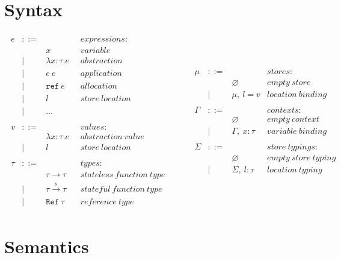 \documentclass{llncs}
\newcommand{\reftt}{\mathtt{ref}~}
\newcommand{\Reftt}{\mathtt{Ref}~}
\begin{document}
\section{Syntax}

\[
\begin{array}{lll}
\begin{array}{lllr}
e & ::= & & expressions \colon\\
& & x & variable\\
& | & \lambda x : \tau . e & abstraction\\
& | & e~e & application\\
& | & \reftt e & allocation\\
& | & l & store~location\\
& | & ...\\
&&&\\
v & ::= & & values \colon\\
& & \lambda x : \tau . e & abstraction~value\\
& | & l & store~location\\
&&&\\
\tau & ::= & & types \colon\\
& & \tau \rightarrow \tau & stateless~function~type\\
& | & \tau \xrightarrow{s} \tau~~~~& stateful~function~type\\
& | & \Reftt \tau & reference~type
\end{array}
& ~~~~~
&
\begin{array}{lllr}
\mu & ::= & & stores \colon\\
& & \varnothing & empty~store\\
& | & \mu,~l = v & location~binding\\
&&&\\
\Gamma & ::= & & contexts \colon\\
& & \varnothing & empty~context\\
& | & \Gamma,~x : \tau & variable~binding\\
&&&\\
\Sigma & ::= & & store~typings \colon\\
& & \varnothing & empty~store~typing\\
& | & \Sigma,~l : \tau & location~typing
\end{array}
\end{array}
\]


\section{Semantics}
\end{document}
